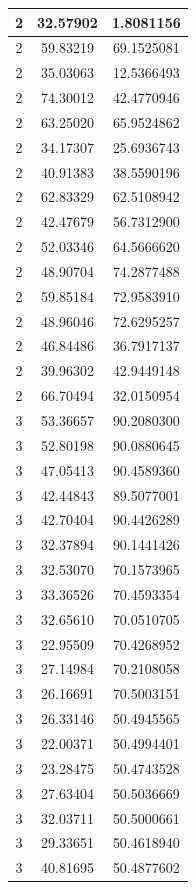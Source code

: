 \documentclass[
]{book}
\begin{document}
\begin{tabular}{c|c|c}
\hline
2 & 32.57902 & 1.8081156\\
\hline
2 & 59.83219 & 69.1525081\\
\hline
2 & 35.03063 & 12.5366493\\
\hline
2 & 74.30012 & 42.4770946\\
\hline
2 & 63.25020 & 65.9524862\\
\hline
2 & 34.17307 & 25.6936743\\
\hline
2 & 40.91383 & 38.5590196\\
\hline
2 & 62.83329 & 62.5108942\\
\hline
2 & 42.47679 & 56.7312900\\
\hline
2 & 52.03346 & 64.5666620\\
\hline
2 & 48.90704 & 74.2877488\\
\hline
2 & 59.85184 & 72.9583910\\
\hline
2 & 48.96046 & 72.6295257\\
\hline
2 & 46.84486 & 36.7917137\\
\hline
2 & 39.96302 & 42.9449148\\
\hline
2 & 66.70494 & 32.0150954\\
\hline
3 & 53.36657 & 90.2080300\\
\hline
3 & 52.80198 & 90.0880645\\
\hline
3 & 47.05413 & 90.4589360\\
\hline
3 & 42.44843 & 89.5077001\\
\hline
3 & 42.70404 & 90.4426289\\
\hline
3 & 32.37894 & 90.1441426\\
\hline
3 & 32.53070 & 70.1573965\\
\hline
3 & 33.36526 & 70.4593354\\
\hline
3 & 32.65610 & 70.0510705\\
\hline
3 & 22.95509 & 70.4268952\\
\hline
3 & 27.14984 & 70.2108058\\
\hline
3 & 26.16691 & 70.5003151\\
\hline
3 & 26.33146 & 50.4945565\\
\hline
3 & 22.00371 & 50.4994401\\
\hline
3 & 23.28475 & 50.4743528\\
\hline
3 & 27.63404 & 50.5036669\\
\hline
3 & 32.03711 & 50.5000661\\
\hline
3 & 29.33651 & 50.4618940\\
\hline
3 & 40.81695 & 50.4877602\\

\end{tabular}
\end{document}
